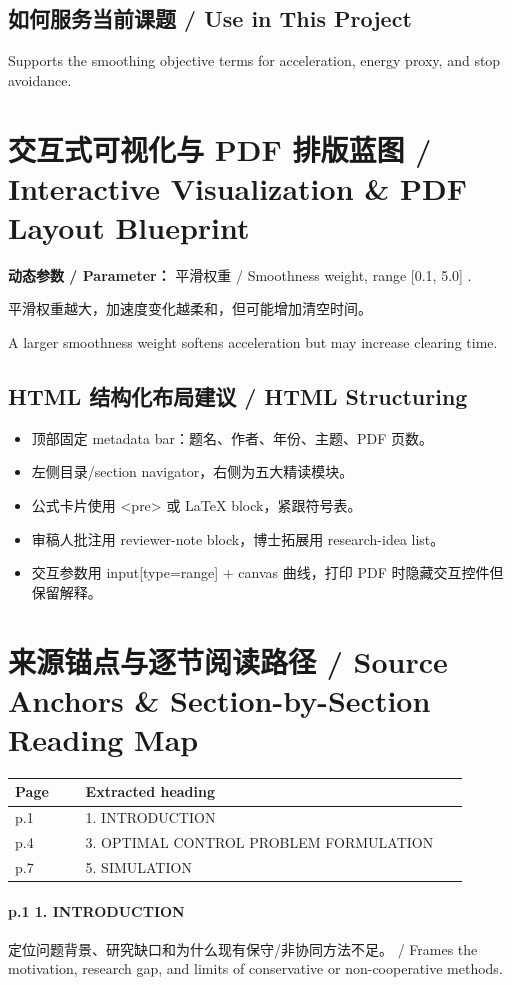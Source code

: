 \documentclass[UTF8,a4paper,11pt,fontset=fandol]{ctexart}
\begin{document}
\subsection{如何服务当前课题 / Use in This Project}
Supports the smoothing objective terms for acceleration, energy proxy, and stop avoidance.

\section{交互式可视化与 PDF 排版蓝图 / Interactive Visualization \& PDF Layout Blueprint}
\textbf{动态参数 / Parameter：} 平滑权重 / Smoothness weight, range [0.1, 5.0] .

平滑权重越大，加速度变化越柔和，但可能增加清空时间。

A larger smoothness weight softens acceleration but may increase clearing time.

\subsection{HTML 结构化布局建议 / HTML Structuring}
\begin{itemize}
\item 顶部固定 metadata bar：题名、作者、年份、主题、PDF 页数。
\item 左侧目录/section navigator，右侧为五大精读模块。
\item 公式卡片使用 <pre> 或 LaTeX block，紧跟符号表。
\item 审稿人批注用 reviewer-note block，博士拓展用 research-idea list。
\item 交互参数用 input[type=range] + canvas 曲线，打印 PDF 时隐藏交互控件但保留解释。
\end{itemize}


\section{来源锚点与逐节阅读路径 / Source Anchors \& Section-by-Section Reading Map}
\begin{longtable}{p{0.14\linewidth}p{0.76\linewidth}}
\toprule
Page & Extracted heading\\
\midrule
p.1 & 1. INTRODUCTION \\
p.4 & 3. OPTIMAL CONTROL PROBLEM FORMULATION \\
p.7 & 5. SIMULATION \\
\bottomrule
\end{longtable}

\paragraph{p.1 1. INTRODUCTION}定位问题背景、研究缺口和为什么现有保守/非协同方法不足。 / Frames the motivation, research gap, and limits of conservative or non-cooperative methods.
\end{document}
